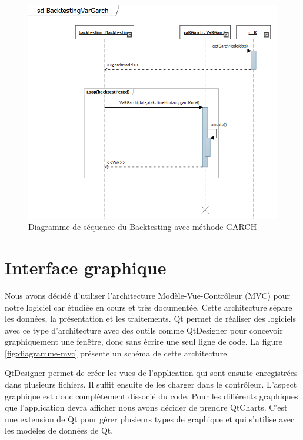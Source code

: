 \documentclass[a4paper,titlepage,french]{report}
\begin{document}
\begin{figure}
	\center
	\includegraphics[scale=0.8]{diagramme_sequence_backtesting.png}
    \caption{Diagramme de séquence du Backtesting avec méthode GARCH}
    \label{fig:diagramme-sequence-backtesting-garch}
\end{figure}


\section{Interface graphique}

Nous avons décidé d’utiliser l'architecture Modèle-Vue-Contrôleur (MVC) pour notre logiciel car étudiée en cours et très documentée.
Cette architecture sépare les données, la présentation et les traitements.
Qt permet de réaliser des logiciels avec ce type d’architecture avec des outils comme QtDesigner pour concevoir graphiquement une fenêtre, donc sans écrire une seul ligne de code.
La figure \ref{fig:diagramme-mvc} présente un schéma de cette architecture.

QtDesigner permet de créer les vues de l’application qui sont ensuite enregistrées dans plusieurs fichiers.
Il suffit ensuite de les charger dans le contrôleur.
L'aspect graphique est donc complètement dissocié du code.
Pour les différents graphiques que l'application devra afficher nous avons décider de prendre QtCharts. C'est une extension de Qt pour gérer plusieurs types de graphique et qui s'utilise avec les modèles de données de Qt.
\end{document}
